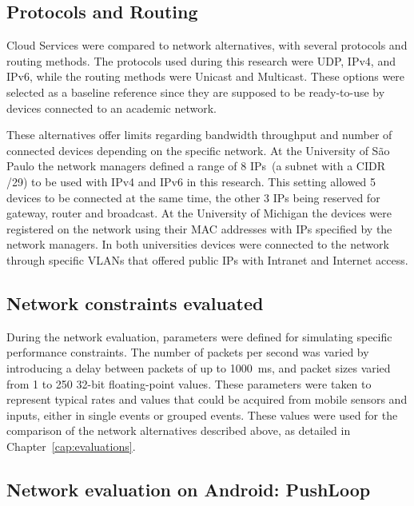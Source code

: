 \subsection*{Protocols and Routing}

Cloud Services were compared to network alternatives, with several protocols and routing methods.
The protocols used during this research were UDP, IPv4, and IPv6, while the routing methods were Unicast and Multicast.
These options were selected as a baseline reference since they are supposed to be ready-to-use by devices connected to an academic network.

These alternatives offer limits regarding bandwidth throughput and number of connected devices depending on the specific network.
At the University of São Paulo the network managers defined a range of 8 IPs~(a subnet with a CIDR /29) to be used with IPv4 and IPv6 in this research.
This setting allowed 5 devices to be connected at the same time, the other 3 IPs being reserved for gateway, router and broadcast.
At the University of Michigan the devices were registered on the network using their MAC addresses with IPs specified by the network managers.
In both universities devices were connected to the network through specific VLANs that offered public IPs with Intranet and Internet access.

\subsection*{Network constraints evaluated}

During the network evaluation, parameters were defined for simulating specific performance constraints.
The number of packets per second was varied by introducing a delay between packets of up to 1000~ms, and packet sizes varied from 1 to 250 32-bit floating-point values. These parameters were taken to represent typical rates and values that could be acquired from mobile sensors and inputs, either in single events or grouped events.
These values were used for the comparison of the network alternatives described above, as detailed in Chapter~\ref{cap:evaluations}.


\subsection{Network evaluation on Android: PushLoop}
\label{sec:apppushloop}

